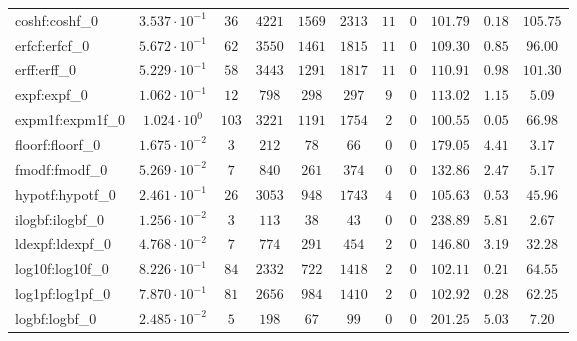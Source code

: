 \begin{tabular}{|l|c|c|c|c|c|c|c|c|c|c|}
coshf:coshf\_0               & $ 3.537 \cdot 10^{-1} $ & $ 36     $ & $ 4221  $ & $ 1569  $ & $ 2313  $ & $ 11  $ & $ 0 $ & $ 101.79      $ & $ 0.18    $ & $ 105.75  $ \\
erfcf:erfcf\_0               & $ 5.672 \cdot 10^{-1} $ & $ 62     $ & $ 3550  $ & $ 1461  $ & $ 1815  $ & $ 11  $ & $ 0 $ & $ 109.30      $ & $ 0.85    $ & $ 96.00   $ \\
erff:erff\_0                 & $ 5.229 \cdot 10^{-1} $ & $ 58     $ & $ 3443  $ & $ 1291  $ & $ 1817  $ & $ 11  $ & $ 0 $ & $ 110.91      $ & $ 0.98    $ & $ 101.30  $ \\
expf:expf\_0                 & $ 1.062 \cdot 10^{-1} $ & $ 12     $ & $ 798   $ & $ 298   $ & $ 297   $ & $ 9   $ & $ 0 $ & $ 113.02      $ & $ 1.15    $ & $ 5.09    $ \\
expm1f:expm1f\_0             & $ 1.024 \cdot 10^{0}  $ & $ 103    $ & $ 3221  $ & $ 1191  $ & $ 1754  $ & $ 2   $ & $ 0 $ & $ 100.55      $ & $ 0.05    $ & $ 66.98   $ \\
floorf:floorf\_0             & $ 1.675 \cdot 10^{-2} $ & $ 3      $ & $ 212   $ & $ 78    $ & $ 66    $ & $ 0   $ & $ 0 $ & $ 179.05      $ & $ 4.41    $ & $ 3.17    $ \\
fmodf:fmodf\_0               & $ 5.269 \cdot 10^{-2} $ & $ 7      $ & $ 840   $ & $ 261   $ & $ 374   $ & $ 0   $ & $ 0 $ & $ 132.86      $ & $ 2.47    $ & $ 5.17    $ \\
hypotf:hypotf\_0             & $ 2.461 \cdot 10^{-1} $ & $ 26     $ & $ 3053  $ & $ 948   $ & $ 1743  $ & $ 4   $ & $ 0 $ & $ 105.63      $ & $ 0.53    $ & $ 45.96   $ \\
ilogbf:ilogbf\_0             & $ 1.256 \cdot 10^{-2} $ & $ 3      $ & $ 113   $ & $ 38    $ & $ 43    $ & $ 0   $ & $ 0 $ & $ 238.89      $ & $ 5.81    $ & $ 2.67    $ \\
ldexpf:ldexpf\_0             & $ 4.768 \cdot 10^{-2} $ & $ 7      $ & $ 774   $ & $ 291   $ & $ 454   $ & $ 2   $ & $ 0 $ & $ 146.80      $ & $ 3.19    $ & $ 32.28   $ \\
log10f:log10f\_0             & $ 8.226 \cdot 10^{-1} $ & $ 84     $ & $ 2332  $ & $ 722   $ & $ 1418  $ & $ 2   $ & $ 0 $ & $ 102.11      $ & $ 0.21    $ & $ 64.55   $ \\
log1pf:log1pf\_0             & $ 7.870 \cdot 10^{-1} $ & $ 81     $ & $ 2656  $ & $ 984   $ & $ 1410  $ & $ 2   $ & $ 0 $ & $ 102.92      $ & $ 0.28    $ & $ 62.25   $ \\
logbf:logbf\_0               & $ 2.485 \cdot 10^{-2} $ & $ 5      $ & $ 198   $ & $ 67    $ & $ 99    $ & $ 0   $ & $ 0 $ & $ 201.25      $ & $ 5.03    $ & $ 7.20    $ \\

\end{tabular}
